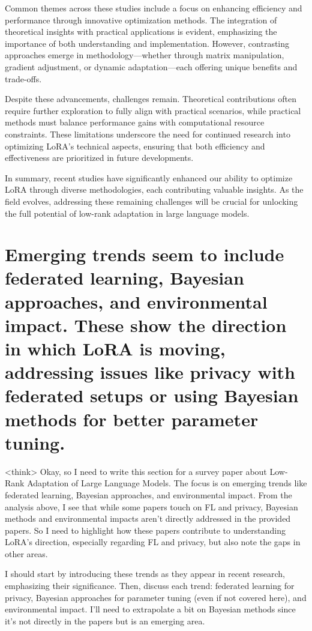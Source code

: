 \documentclass[conference]{IEEEtran}
\begin{document}
Common themes across these studies include a focus on enhancing efficiency and performance through innovative optimization methods. The integration of theoretical insights with practical applications is evident, emphasizing the importance of both understanding and implementation. However, contrasting approaches emerge in methodology—whether through matrix manipulation, gradient adjustment, or dynamic adaptation—each offering unique benefits and trade-offs.

Despite these advancements, challenges remain. Theoretical contributions often require further exploration to fully align with practical scenarios, while practical methods must balance performance gains with computational resource constraints. These limitations underscore the need for continued research into optimizing LoRA's technical aspects, ensuring that both efficiency and effectiveness are prioritized in future developments.

In summary, recent studies have significantly enhanced our ability to optimize LoRA through diverse methodologies, each contributing valuable insights. As the field evolves, addressing these remaining challenges will be crucial for unlocking the full potential of low-rank adaptation in large language models.

\section{Emerging trends seem to include federated learning, Bayesian approaches, and environmental impact. These show the direction in which LoRA is moving, addressing issues like privacy with federated setups or using Bayesian methods for better parameter tuning.}
<think>
Okay, so I need to write this section for a survey paper about Low-Rank Adaptation of Large Language Models. The focus is on emerging trends like federated learning, Bayesian approaches, and environmental impact. From the analysis above, I see that while some papers touch on FL and privacy, Bayesian methods and environmental impacts aren't directly addressed in the provided papers. So I need to highlight how these papers contribute to understanding LoRA's direction, especially regarding FL and privacy, but also note the gaps in other areas.

I should start by introducing these trends as they appear in recent research, emphasizing their significance. Then, discuss each trend: federated learning for privacy, Bayesian approaches for parameter tuning (even if not covered here), and environmental impact. I'll need to extrapolate a bit on Bayesian methods since it's not directly in the papers but is an emerging area.
\end{document}

